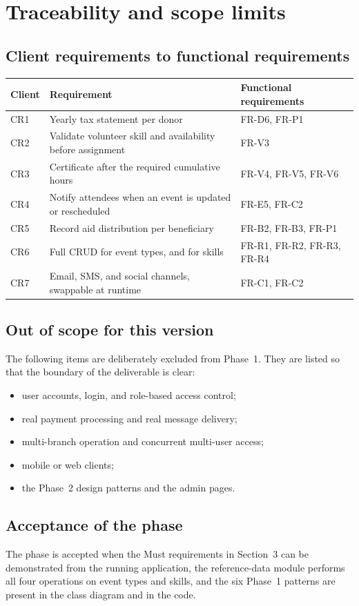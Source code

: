 \section{Traceability and scope limits}

\subsection{Client requirements to functional requirements}

\begin{center}
\small
\begin{tabularx}{\textwidth}{@{}L{0.08\textwidth}L{0.52\textwidth}Y@{}}
\toprule
\textbf{Client} & \textbf{Requirement} & \textbf{Functional requirements} \\
\midrule
CR1 & Yearly tax statement per donor & FR-D6, FR-P1 \\
CR2 & Validate volunteer skill and availability before assignment & FR-V3 \\
CR3 & Certificate after the required cumulative hours & FR-V4, FR-V5, FR-V6 \\
CR4 & Notify attendees when an event is updated or rescheduled & FR-E5, FR-C2 \\
CR5 & Record aid distribution per beneficiary & FR-B2, FR-B3, FR-P1 \\
CR6 & Full CRUD for event types, and for skills & FR-R1, FR-R2, FR-R3, FR-R4 \\
CR7 & Email, SMS, and social channels, swappable at runtime & FR-C1, FR-C2 \\
\bottomrule
\end{tabularx}
\end{center}

\subsection{Out of scope for this version}

The following items are deliberately excluded from Phase~1. They are listed so that the boundary of the deliverable is clear:

\begin{itemize}
  \item user accounts, login, and role-based access control;
  \item real payment processing and real message delivery;
  \item multi-branch operation and concurrent multi-user access;
  \item mobile or web clients;
  \item the Phase~2 design patterns and the admin pages.
\end{itemize}

\subsection{Acceptance of the phase}

The phase is accepted when the Must requirements in Section~3 can be demonstrated from the running application, the reference-data module performs all four operations on event types and skills, and the six Phase~1 patterns are present in the class diagram and in the code.
